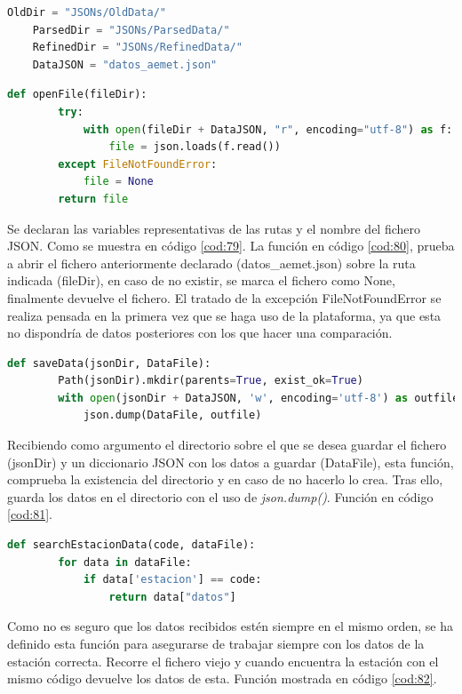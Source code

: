 \begin{lstlisting}[language=Python, caption={Declaración rutas JSONs y nombre de fichero}, label=cod:79]
	OldDir = "JSONs/OldData/"
	ParsedDir = "JSONs/ParsedData/"
	RefinedDir = "JSONs/RefinedData/"
	DataJSON = "datos_aemet.json"
\end{lstlisting}

\begin{lstlisting}[language=Python, caption={Declaración función openFile()}, label=cod:80]
	def openFile(fileDir):
		try:
			with open(fileDir + DataJSON, "r", encoding="utf-8") as f:
				file = json.loads(f.read())
		except FileNotFoundError:
			file = None
		return file
\end{lstlisting}

Se declaran las variables representativas de las rutas y el nombre del fichero JSON. Como se muestra en código \ref{cod:79}. La función en código \ref{cod:80}, prueba a abrir el fichero anteriormente declarado (datos\_aemet.json) sobre la ruta indicada (fileDir), en caso de no existir, se marca el fichero como None, finalmente devuelve el fichero. El tratado de la excepción FileNotFoundError se realiza pensada en la primera vez que se haga uso de la plataforma, ya que esta no dispondría de datos posteriores con los que hacer una comparación.

\begin{lstlisting}[language=Python, caption={Declaración función saveFile()}, label=cod:81]
	def saveData(jsonDir, DataFile):
		Path(jsonDir).mkdir(parents=True, exist_ok=True)
		with open(jsonDir + DataJSON, 'w', encoding='utf-8') as outfile:
			json.dump(DataFile, outfile)
\end{lstlisting}

Recibiendo como argumento el directorio sobre el que se desea guardar el fichero (jsonDir) y un diccionario JSON con los datos a guardar (DataFile), esta función, comprueba la existencia del directorio y en caso de no hacerlo lo crea. Tras ello, guarda los datos en el directorio con el uso de \textit{json.dump()}. Función en código \ref{cod:81}.

\begin{lstlisting}[language=Python, caption={Declaración función searchEstacionData()}, label=cod:82]
	def searchEstacionData(code, dataFile):
		for data in dataFile:
			if data['estacion'] == code:
				return data["datos"]
\end{lstlisting}

Como no es seguro que los datos recibidos estén siempre en el mismo orden, se ha definido esta función para asegurarse de trabajar siempre con los datos de la estación correcta. Recorre el fichero viejo y cuando encuentra la estación con el mismo código devuelve los datos de esta. Función mostrada en código \ref{cod:82}.

